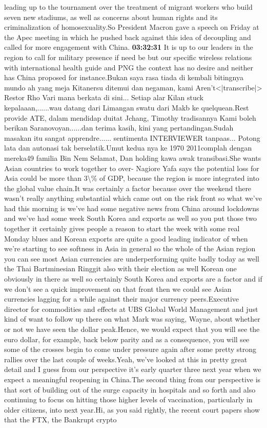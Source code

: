 \documentclass{article}%
\begin{document}
leading up to the tournament over the treatment of migrant workers who build seven new stadiums, as well as concerns about human rights and its criminalization of homosexuality.So President Macron gave a speech on Friday at the Apec meeting in which he pushed back against this idea of decoupling and called for more engagement with China.%
\textbf{03:32:31}%
\newline%
It is up to our leaders in the region to call for military presence if need be but our specific wireless relations with international health guide and PNG the context has no desire and neither has China proposed for instance.Bukan saya rasa tiada di kembali bitingnya mundo ah yang meja Kitanersu ditemui dan negaman, kami Aren't<|transcribe|> Restor Rho Vari mana berkata di sini... Setiap alar Kilan stuck kepalaaan,......wau datang dari Limangan swatu dari Makb  ke quelquean.Rest provide ATE, dalam mendidap duitat Jchang, Timothy tradisannya Kami boleh berikan Saranovoyan......dan terima kasih, kini yang pertandingan.Sudah masakan itu sangat apprendre...... sentimenta INTERVIEWER tanpaas... Potong lata dan autonasi tak berselatik.Umut kedua nya ke 1970 2011complah dengan mereka49 familia Bin Nem Selamat, Dan holding kawa awak transibasi.She wants Asian countries to work together to over{-}  Nagiore Yafa says the potential loss for Asia could be more than 3\textbackslash{}\% of GDP, because the region is more integrated into the global value chain.It was certainly a factor because over the weekend there wasn't really anything substantial which came out on the risk front so what we've had this morning is we've had some negative news from China around lockdowns and we've had some week South Korea and exports as well so you put those two together it certainly gives people a reason to start the week with some real Monday blues and Korean exports are quite a good leading indicator of when we're starting to see softness in Asia in general so the whole of the Asian region you can see most Asian currencies are underperforming quite badly today as well the Thai Bartminesian Ringgit also with their election as well Korean one obviously in there as well so certainly South Korea and exports are a factor and if we don't see a quick improvement on that front then we could see Asian currencies lagging for a while against their major currency peers.Executive director for commodities and effects at UBS Global World Management and just kind of want to follow up there on what Mark was saying, Wayne, about whether or not we have seen the dollar peak.Hence, we would expect that you will see the euro dollar, for example, back below parity and as a consequence, you will see some of the crosses begin to come under pressure again after some pretty strong rallies over the last couple of weeks.Yeah, we've looked at this in pretty great detail and I guess from our perspective it's early quarter three next year when we expect a meaningful reopening in China.The second thing from our perspective is that sort of building out of the surge capacity in hospitals and so forth and also continuing to focus on hitting those higher levels of vaccination, particularly in older citizens, into next year.Hi, as you said rightly, the recent court papers show that the FTX, the Bankrupt crypto 
\end{document}
